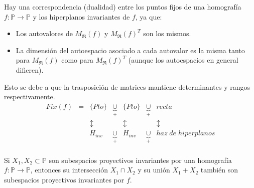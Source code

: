 
\begin{observación}
    Hay una correspondencia (dualidad) entre los puntos fijos de una homografía $f: \mathbb{P} \to \mathbb{P}$ y los hiperplanos invariantes de $f$, ya que:
    \begin{itemize}
        \item Los autovalores de $M_{\mathfrak{R}}(f)$ y $M_{\mathfrak{R}}(f)^T$ son los mismos.
        \item La dimensión del autoespacio asociado a cada autovalor es la misma tanto para $M_{\mathfrak{R}}(f)$ como para $M_{\mathfrak{R}}(f)^T$ (aunque los autoespacios en general difieren).
    \end{itemize}
    Esto se debe a que la trasposición de matrices mantiene determinantes y rangos respectivamente.
    \[
    \begin{array}{ccccccc}
        Fix(f) & = & \{Pto\} & \underbrace{\cup}_{+} & \{Pto\} & \underbrace{\cup}_{+} & recta \\
        & & \updownarrow & & \updownarrow & & \updownarrow \\
        & & H_{inv} & \underbrace{\cup}_{+} & H_{inv} & \underbrace{\cup}_{+} & haz\; de\; hiperplanos \\ 
    \end{array}
    \]
\end{observación}

\begin{observación}
    Si $X_1,X_2 \subset \mathbb{P}$ son subespacios proyectivos invariantes por una homografía $f: \mathbb{P} \to \mathbb{P}$, entonces su intersección $X_1 \cap X_2$ y su unión $X_1 + X_2$ también son subespacios proyectivos invariantes por $f$.
\end{observación}